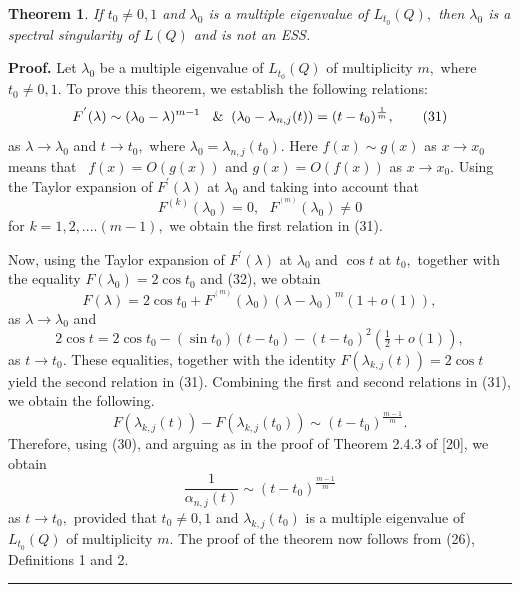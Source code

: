 \documentclass{article}%
\newtheorem{theorem}{Theorem}
{}
\newenvironment{proof}[1][Proof]{\textbf{#1.} }{\ \rule{0.5em}{0.5em}}
\begin{document}
\begin{theorem}
If $t_{0}\neq0,1$ and $\lambda_{0}$ is a multiple eigenvalue of $L_{t_{0}%
}(Q),$ then $\lambda_{0}$ is a spectral singularity of $L(Q)$ and is not an ESS.
\end{theorem}

\begin{proof}
Let $\lambda_{0}$ be a multiple eigenvalue of $L_{t_{0}}(Q)$ of multiplicity
$m,$ where $t_{0}\neq0,1.$ To prove this theorem, we establish the following
relations:
\begin{equation}
F^{^{\prime}}(\lambda)\sim(\lambda_{0}-\lambda)^{m-1}\text{ }\And(\lambda
_{0}-\lambda_{n,j}(t))=(t-t_{0})^{\frac{1}{m}}, \tag{31}%
\end{equation}
as $\lambda\rightarrow\lambda_{0}$ and $t\rightarrow t_{0},$ where
$\lambda_{0}=\lambda_{n,j}(t_{0})$. Here $f(x)\sim g(x)$ as $x\rightarrow
x_{0}$ means that \ $f(x)=O(g(x))$ and $g(x)=O(f(x))$ as $x\rightarrow x_{0}.$
Using the Taylor expansion of $F^{\prime}(\lambda)$ at $\lambda_{0}$ and
taking into account that
\begin{equation}
F^{(k)}(\lambda_{0})=0,\text{ }F^{^{(m)}}(\lambda_{0})\neq0 \tag{32}%
\end{equation}
for $k=1,2,....(m-1),$ we obtain the first relation in (31).

Now, using the Taylor expansion of $F^{\prime}(\lambda)$ at $\lambda_{0}$ and
$\cos t$ at $t_{0},$ together with the equality $F(\lambda_{0})=2\cos t_{0}$
and (32), we obtain
\[
F(\lambda)=2\cos t_{0}+F^{^{(m)}}(\lambda_{0})(\lambda-\lambda_{0}%
)^{m}(1+o(1)),
\]
as $\lambda\rightarrow\lambda_{0}$ and
\[
2\cos t=2\cos t_{0}-\left(  \sin t_{0}\right)  (t-t_{0})-(t-t_{0})^{2}\left(
\tfrac{1}{2}+o(1)\right)  ,
\]
as $t\rightarrow t_{0}.$ These equalities, together with the identity
$F(\lambda_{k,j}(t))=2\cos t$ yield the second relation in (31). Combining the
first and second relations in (31), we obtain the following.
\begin{equation}
F(\lambda_{k,j}(t))-F(\lambda_{k,j}(t_{0}))\sim(t-t_{0})^{\frac{m-1}{m}}.
\tag{33}%
\end{equation}
Therefore, using (30), and arguing as in the proof of Theorem 2.4.3 of [20],
we obtain%
\begin{equation}
\frac{1}{\alpha_{n,j}(t)}\sim(t-t_{0})^{\frac{m-1}{m}} \tag{34}%
\end{equation}
as $t\rightarrow t_{0},$ provided that $t_{0}\neq0,1$ and $\lambda_{k,j}%
(t_{0})$ is a multiple eigenvalue of $L_{t_{0}}(Q)$ of multiplicity $m.$ The
proof of the theorem now follows from (26), Definitions 1 and 2.
\end{proof}
\end{document}
